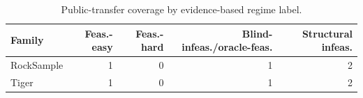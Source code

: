 \begin{table}[t]
\centering
\small
\caption{Public-transfer coverage by evidence-based regime label.}
\label{tab:public_transfer_family_coverage}
\begin{tabular}{lrrrr}
\toprule
Family & Feas.-easy & Feas.-hard & Blind-infeas./oracle-feas. & Structural infeas. \\
\midrule
RockSample & 1 & 0 & 1 & 2 \\
Tiger & 1 & 0 & 1 & 2 \\
\bottomrule
\end{tabular}
\end{table}
